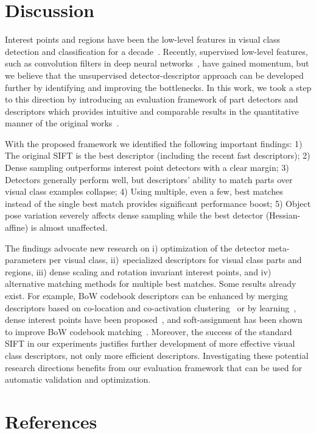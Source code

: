 \documentclass[review]{elsarticle}
\begin{document}
%
\section{Discussion}
%
Interest points and regions have been the low-level features in
visual class detection and classification for a decade~\cite{SivZis:2003}.
Recently, supervised low-level features, such as
convolution filters in deep neural
networks~\cite{KriSutHin:2012}, have gained momentum, but we
believe that the unsupervised detector-descriptor
approach can be developed further by identifying and improving
the bottlenecks.
In this work, we took a step to this direction by introducing
an evaluation framework of
part detectors and descriptors which provides intuitive
and comparable results in the quantitative manner of the original
works~\cite{MikTuySch:2005,MikSch:2005}.

With the proposed framework we identified the following
important findings:
1) The original SIFT is the best descriptor (including the recent fast descriptors);
2) Dense sampling outperforms interest point detectors with a clear margin;
3) Detectors generally perform well, but descriptors' ability to match
parts over visual class examples collapse;
4) Using multiple, even a few, best matches instead of the single best match
provides significant performance boost;
5) Object pose variation severely affects dense sampling
while the best detector (Hessian-affine) is almost unaffected.

The findings advocate new research on i) optimization of the detector
meta-parameters per visual class, ii)~specialized descriptors
for visual class parts and regions, iii) dense scaling and rotation
invariant interest points, and iv) alternative matching methods for
multiple best matches. Some results already exist.
For example, BoW codebook descriptors can be enhanced by merging
descriptors based on co-location and co-activation
clustering~\cite{LeiEttSch:2008} or by learning~\cite{SimVedZis:2014}, dense interest points have
been proposed~\cite{Tuy:2010}, and soft-assignment has been shown
to improve BoW codebook matching~\cite{AgaTri:2008}.
Moreover, the success of the standard SIFT in our experiments
justifies further development of more effective visual class
descriptors, not only more efficient descriptors. Investigating
these potential research directions benefits from our evaluation
framework that can be used for automatic validation and optimization.


\section*{References}


\end{document}
